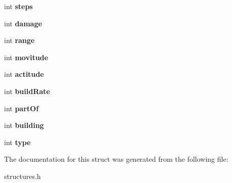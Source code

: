 \begin{DoxyCompactItemize}
\item 
\hypertarget{struct__Bot_a448ebaed89622ad99f34c1aedd0238dc}{
int {\bfseries steps}}
\label{struct__Bot_a448ebaed89622ad99f34c1aedd0238dc}

\item 
\hypertarget{struct__Bot_a869d2150e92439a163792581bcae0af2}{
int {\bfseries damage}}
\label{struct__Bot_a869d2150e92439a163792581bcae0af2}

\item 
\hypertarget{struct__Bot_af77000f12da1b214a6e8eba86994d1bf}{
int {\bfseries range}}
\label{struct__Bot_af77000f12da1b214a6e8eba86994d1bf}

\item 
\hypertarget{struct__Bot_a2dc620ec845ee001bc90609df5a5ce1f}{
int {\bfseries movitude}}
\label{struct__Bot_a2dc620ec845ee001bc90609df5a5ce1f}

\item 
\hypertarget{struct__Bot_a92ea66d0f290429aa732b28a872e23c7}{
int {\bfseries actitude}}
\label{struct__Bot_a92ea66d0f290429aa732b28a872e23c7}

\item 
\hypertarget{struct__Bot_ac81d97c9fc26363210eb3e6e8736fdf3}{
int {\bfseries buildRate}}
\label{struct__Bot_ac81d97c9fc26363210eb3e6e8736fdf3}

\item 
\hypertarget{struct__Bot_ae03ba29225a1468b981bc44faf0aabed}{
int {\bfseries partOf}}
\label{struct__Bot_ae03ba29225a1468b981bc44faf0aabed}

\item 
\hypertarget{struct__Bot_a7784a3b6301ea5d3556ab5ef93fb4dc7}{
int {\bfseries building}}
\label{struct__Bot_a7784a3b6301ea5d3556ab5ef93fb4dc7}

\item 
\hypertarget{struct__Bot_a460e784b7657c229eccea105479268cd}{
int {\bfseries type}}
\label{struct__Bot_a460e784b7657c229eccea105479268cd}

\end{DoxyCompactItemize}


The documentation for this struct was generated from the following file:\begin{DoxyCompactItemize}
\item 
structures.h\end{DoxyCompactItemize}
